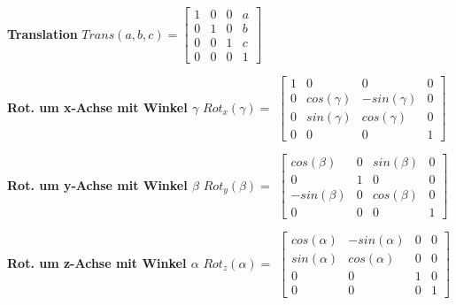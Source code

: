 \vspace{\baselineskip}
{\footnotesize
\begin{minipage}{0.25\linewidth}
    \textbf{Translation}\newline
    $Trans(a,b,c)=\begin{bmatrix}
    1 & 0 & 0 & a \\ 
    0 & 1 & 0 & b \\ 
    0 & 0 & 1 & c \\ 
    0 & 0 & 0 &  1
    \end{bmatrix}$
\end{minipage}
\begin{minipage}{0.25\linewidth}
    \textbf{Rot. um x-Achse mit Winkel $ \gamma$}\newline
    $ Rot_x(\gamma)=$\newline
    $\begin{bmatrix}
    1 & 0 & 0 & 0 \\ 
    0 & cos(\gamma) & -sin(\gamma) & 0 \\ 
    0 & sin(\gamma) & cos(\gamma) & 0 \\ 
    0 & 0 & 0 & 1
    \end{bmatrix}$
\end{minipage}    
\begin{minipage}{0.25\linewidth}
    \textbf{Rot. um y-Achse mit Winkel $ \beta$}\newline
    $ Rot_y(\beta)=$\newline
    $\begin{bmatrix}
    cos(\beta)& 0  & sin(\beta)  & 0  \\ 
    0 & 1 & 0 & 0  \\ 
    -sin(\beta)&  0 & cos(\beta) & 0 \\ 
    0 & 0 & 0  & 1
    \end{bmatrix}$
\end{minipage}
\begin{minipage}{0.25\linewidth}
    \textbf{Rot. um z-Achse mit Winkel $\alpha$}\newline
    $Rot_z(\alpha)=$\newline
    $\begin{bmatrix}
    cos(\alpha)& -sin(\alpha) & 0 & 0 \\ 
    sin(\alpha)&  cos(\alpha)& 0 & 0 \\ 
    0 & 0 & 1 & 0 \\ 
    0 & 0 & 0 & 1
    \end{bmatrix} $
\end{minipage} 
}


